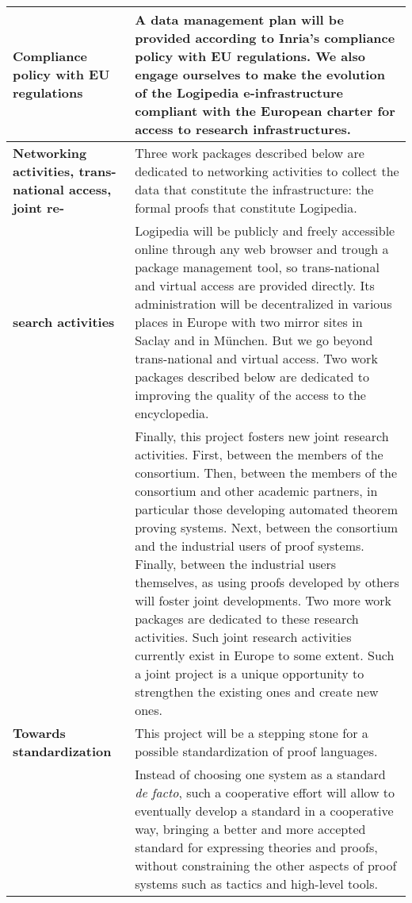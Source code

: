 \begin{longtable}{|p{}|p{}|}
\hline
{\bf Compliance policy with EU regulations}
&
A data management plan will be provided according to Inria’s
compliance policy with EU regulations. We also engage ourselves to
make the evolution of the Logipedia e-infrastructure compliant
with the European charter for access to research infrastructures.\\

\hline
{\bf Networking activities, trans-national access, joint re-}
&
Three work packages described below are dedicated to networking activities
to collect the data that constitute the infrastructure: the formal proofs
that constitute Logipedia.\\
{\bf search activities}
&
\hspace{0.4cm}
Logipedia will be publicly and freely accessible online through any
web browser and trough a package management tool, so trans-national
and virtual access are provided directly. Its administration will be
decentralized in various places in Europe with two mirror sites in
Saclay and in München. But we go beyond trans-national and virtual
access.  Two work packages described below are dedicated to improving
the quality of the access to the encyclopedia.\\
&
\hspace{0.4cm}
Finally, this project fosters new joint research activities. First,
between the members of the consortium. Then, between the members of
the consortium and other academic partners, in particular those
developing automated theorem proving systems. Next, between the
consortium and the industrial users of proof systems. Finally, between
the industrial users themselves, as using proofs developed by others
will foster joint developments. Two more work packages are dedicated
to these research activities.  Such joint research activities
currently exist in Europe to some extent.  Such a joint project is a
unique opportunity to strengthen the existing ones and create new
ones.\\

\hline
{\bf Towards standardization}
&
This project will be a stepping stone for a possible standardization
of proof languages.\\
&
\hspace{0.4cm}
Instead of choosing one system as a standard {\em de facto}, such a
cooperative effort will allow to eventually develop a standard in a
cooperative way, bringing a better and more accepted standard for
expressing theories and proofs, without constraining the other aspects
of proof systems such as tactics and high-level tools.\\


\end{longtable}
